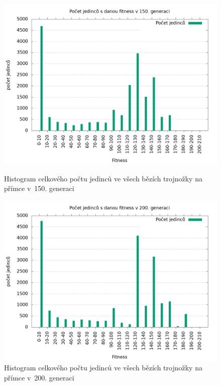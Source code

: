 \begin{figure}[h]
    \begin{minipage}[c]{0.48\linewidth}
        \includegraphics[width=\linewidth]{obrazky/trojnozka_primka_fitnessHistogram150.png}
        \caption{Histogram celkového počtu jedinců ve všech bězích trojnožky na přímce v~150. generaci}
        \label{fig:trojnozka_primka_histogram_150}
    \end{minipage}
    \hfill
    \begin{minipage}[c]{0.48\linewidth}
        \includegraphics[width=\linewidth]{obrazky/trojnozka_primka_fitnessHistogram200.png}
        \caption{Histogram celkového počtu jedinců ve všech bězích trojnožky na přímce v~200. generaci}
        \label{fig:trojnozka_primka_histogram_200}
    \end{minipage}
\end{figure}

